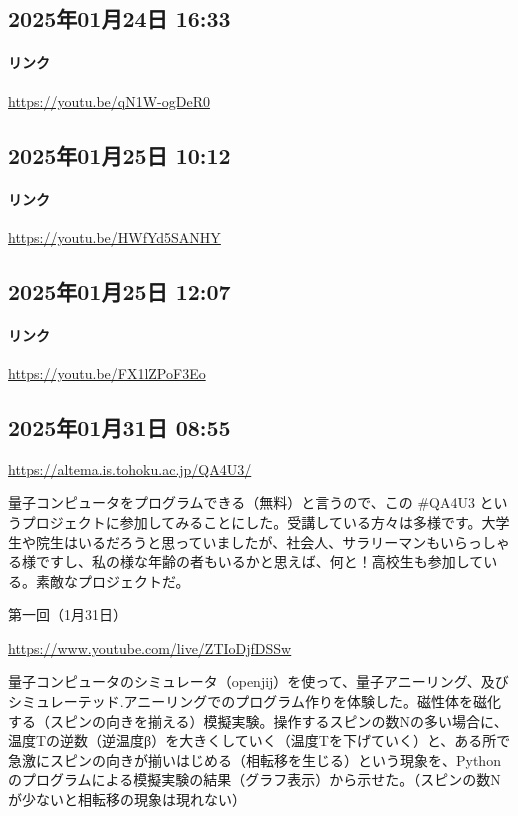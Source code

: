 \subsection*{2025年01月24日 16:33}

\paragraph{リンク}
\url{https://youtu.be/qN1W-ogDeR0}

\subsection*{2025年01月25日 10:12}

\paragraph{リンク}
\url{https://youtu.be/HWfYd5SANHY}

\subsection*{2025年01月25日 12:07}

\paragraph{リンク}
\url{https://youtu.be/FX1lZPoF3Eo}

\subsection*{2025年01月31日 08:55}

\url{https://altema.is.tohoku.ac.jp/QA4U3/}

量子コンピュータをプログラムできる（無料）と言うので、この \#QA4U3 というプロジェクトに参加してみることにした。受講している方々は多様です。大学生や院生はいるだろうと思っていましたが、社会人、サラリーマンもいらっしゃる様ですし、私の様な年齢の者もいるかと思えば、何と！高校生も参加している。素敵なプロジェクトだ。

第一回（1月31日）

\url{https://www.youtube.com/live/ZTIoDjfDSSw}

量子コンピュータのシミュレータ（openjij）を使って、量子アニーリング、及びシミュレーテッド.アニーリングでのプログラム作りを体験した。磁性体を磁化する（スピンの向きを揃える）模擬実験。操作するスピンの数Nの多い場合に、温度Tの逆数（逆温度β）を大きくしていく（温度Tを下げていく）と、ある所で急激にスピンの向きが揃いはじめる（相転移を生じる）という現象を、Pythonのプログラムによる模擬実験の結果（グラフ表示）から示せた。（スピンの数Nが少ないと相転移の現象は現れない）

